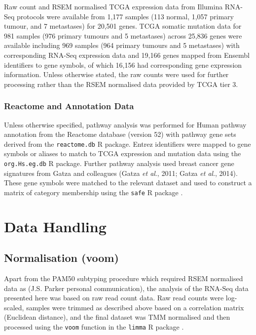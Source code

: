 Raw count and RSEM normalised TCGA expression data from Illumina RNA-Seq protocols were available from 1,177 samples (113 normal, 1,057 primary tumour, and 7 metastases) for 20,501 genes. TCGA somatic mutation data for 981 samples (976 primary tumours and 5 metastases) across 25,836 genes were available including 969 samples (964 primary tumours and 5 metastases) with corresponding RNA-Seq expression data and 19,166 genes mapped from Ensembl identifiers to gene symbols, of which 16,156 had corresponding gene expression information. Unless otherwise stated, the raw counts were used for further processing rather than the RSEM normalised data provided by TCGA tier 3.

\subsubsection{Reactome and Annotation Data} \label{methods:gene_set}

Unless otherwise specified, pathway analysis was performed for Human pathway annotation from the Reactome database (version 52) with pathway gene sets derived from the \texttt{reactome.db} R package. Entrez identifiers were mapped to gene symbols or aliases to match to TCGA expression and mutation data using the \texttt{org.Hs.eg.db} R package. Further pathway analysis used breast cancer gene signatures from Gatza and colleagues (Gatza \textit{et al}., 2011; Gatza \textit{et al}., 2014). These gene symbols were matched to the relevant dataset and used to construct a matrix of category membership using the \texttt{safe} R package \cite{safe}.

\section{Data Handling}

\subsection{Normalisation (voom)}

Apart from the PAM50 subtyping procedure \cite{Parker2009} which required RSEM normalised data as (J.S. Parker personal communication), the analysis of the RNA-Seq data presented here was based on raw read count data. Raw read counts were log-scaled, samples were trimmed as described above based on a correlation matrix (Euclidean distance), and the final dataset was TMM normalised \cite{Robinson2010} and then processed using the \texttt{voom} function \cite{Law2014} in the \texttt{limma} R package \cite{limma}.

